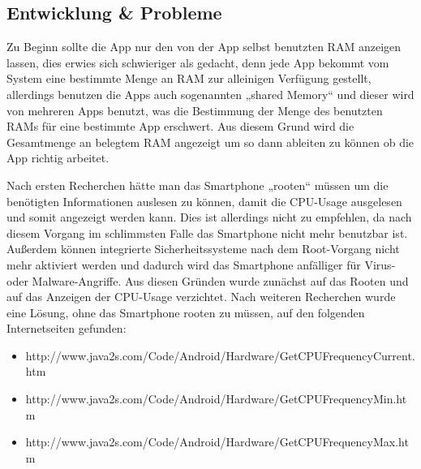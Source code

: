 \documentclass[12pt, onecolumn,notitlepage]{scrartcl}
\begin{document}
\subsection{Entwicklung \& Probleme}
Zu Beginn sollte die App nur den von der App selbst benutzten RAM anzeigen lassen, dies erwies sich schwieriger als gedacht, denn jede App bekommt vom System eine bestimmte Menge an RAM zur alleinigen Verfügung gestellt, allerdings benutzen die Apps auch sogenannten „shared Memory“ und dieser wird von mehreren Apps benutzt, was die Bestimmung der Menge des benutzten RAMs für eine bestimmte App erschwert. Aus diesem Grund wird die Gesamtmenge an belegtem RAM angezeigt um so dann ableiten zu können ob die App richtig arbeitet. \par
Nach ersten Recherchen hätte man das Smartphone „rooten“ müssen um die benötigten Informationen auslesen zu können, damit die CPU-Usage ausgelesen und somit angezeigt werden kann. Dies ist allerdings nicht zu empfehlen, da nach diesem Vorgang im schlimmsten Falle das Smartphone nicht mehr benutzbar ist. Außerdem können integrierte Sicherheitssysteme nach dem Root-Vorgang nicht mehr aktiviert werden und dadurch wird das Smartphone anfälliger für Virus- oder Malware-Angriffe. Aus diesen Gründen wurde zunächst auf das Rooten und auf das Anzeigen der CPU-Usage verzichtet. Nach weiteren Recherchen wurde eine Lösung, ohne das Smartphone rooten zu müssen, auf den folgenden Internetseiten gefunden:
\begin{itemize}
	\itemsep0pt
	\item http://www.java2s.com/Code/Android/Hardware/GetCPUFrequencyCurrent.htm
	\item http://www.java2s.com/Code/Android/Hardware/GetCPUFrequencyMin.htm
	\item http://www.java2s.com/Code/Android/Hardware/GetCPUFrequencyMax.htm 
\end{itemize}
\end{document}
